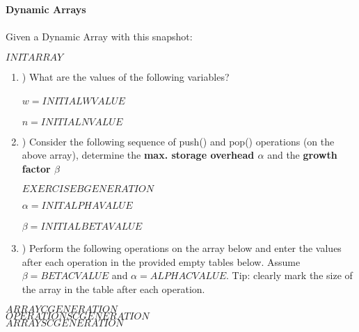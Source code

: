 \documentclass[12pt]{article}
\begin{document}
    \textbf{\LARGE{\color{tumgadRed} Dynamic Arrays}}\\
    \\
    \noindent
    Given a Dynamic Array with this snapshot:
    \begin{center}
        $INITARRAY$
    \end{center}
    \begin{enumerate}[label=\alph*]
        \item \hspace{-5px}) What are the values of the following variables?\\
        \\
        \color{tumgadRed}
        $w = INITIALWVALUE$\\
        \\
        $n = INITIALNVALUE$
        \\
        \color{black}
        \item \hspace{-5px}) Consider the following sequence of push() and pop() operations (on the above array), determine the \textbf{max. storage overhead $\alpha$}
        and the \textbf{growth factor $\beta$}
        \begin{center}
            $EXERCISEBGENERATION$
        \end{center}
        \color{tumgadRed}
        $\alpha = INITALPHAVALUE$\\
        \\
        $\beta = INITIALBETAVALUE$\\
        \color{black}
        \item \hspace{-5px}) Perform the following operations on the array below and enter the values after each operation in the provided empty
        tables below. Assume $\beta = BETACVALUE$ and $\alpha = ALPHACVALUE$. Tip: clearly mark the size of the array in the table after each operation.
    \end{enumerate}
    \begin{center}
        $ARRAYCGENERATION$\\
        \color{tumgadRed}
        $OPERATIONSCGENERATION$\\
        $ARRAYSCGENERATION$
        \color{black}
    \end{center}
\end{document}
